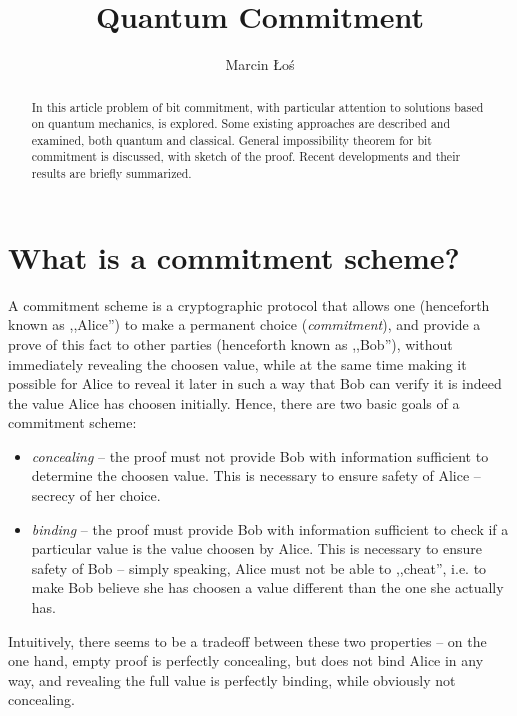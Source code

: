\documentclass[10pt]{article}
\begin{document}
\begin{opening}

\title{Quantum Commitment}
\author[AGH University of Science and Technology, los@student.agh.edu.pl]{Marcin Łoś}

\begin{abstract}
  In this article problem of bit commitment, with particular attention to solutions based
  on quantum mechanics, is explored. Some existing approaches are described and examined,
  both quantum and classical. General impossibility theorem for bit commitment is discussed,
  with sketch of the proof. Recent developments and their results are briefly summarized.
\end{abstract}


\end{opening}

\section{What is a commitment scheme?} 

A commitment scheme is a cryptographic protocol that allows one (henceforth known as ,,Alice'') to make a
permanent choice (\emph{commitment}), and provide a prove of this fact to other parties (henceforth known
as ,,Bob''), without immediately revealing the choosen value, while at the same time making it possible 
for Alice to reveal it later in such a way that Bob can verify it is indeed the value Alice has choosen 
initially. Hence, there are two basic goals of a commitment scheme:

\begin{itemize}
  \item \emph{concealing} -- the proof must not provide Bob with information sufficient to determine the
    choosen value. This is necessary to ensure safety of Alice -- secrecy of her choice.
  \item \emph{binding} -- the proof must provide Bob with information sufficient to check if a particular
    value is the value choosen by Alice. This is necessary to ensure safety of Bob -- simply speaking,
    Alice must not be able to ,,cheat'', i.e. to make Bob believe she has choosen a value different than
    the one she actually has.
\end{itemize}

Intuitively, there seems to be a tradeoff between these two properties -- on the one hand, empty proof
is perfectly concealing, but does not bind Alice in any way, and revealing the full value is perfectly
binding, while obviously not concealing.
\end{document}
